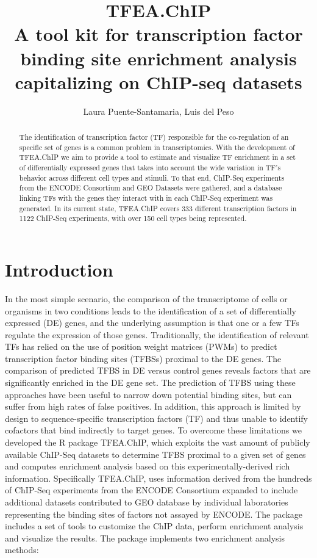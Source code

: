 \documentclass[a4paper, 12pt ]{article}
\author{Laura Puente-Santamaria, Luis del Peso}
\title{TFEA.ChIP\\\large A tool kit for transcription factor binding site enrichment analysis capitalizing on ChIP-seq datasets}
\begin{document}
	\maketitle
\begin{abstract}

The identification of transcription factor (TF) responsible for the co-regulation of an specific set of genes is a common problem in transcriptomics. With the development of TFEA.ChIP we aim to provide a tool to estimate and visualize TF enrichment in a set of differentially expressed genes that takes into account the wide variation in TF's behavior across different cell types and stimuli. To that end, ChIP-Seq experiments from the ENCODE Consortium and GEO Datasets were gathered, and a database linking TFs with the genes they interact with in each ChIP-Seq experiment was generated. In its current state, TFEA.ChIP covers 333 different transcription factors in 1122 ChIP-Seq experiments, with over 150 cell types being represented.

\end{abstract}

\section{Introduction}

 In the most simple scenario, the comparison of the transcriptome of cells or organisms in two conditions leads to the identification of a set of differentially expressed (DE) genes, and the underlying assumption is that one or a few TFs regulate the expression of those genes. Traditionally, the identification of relevant TFs has relied on the use of position weight matrices (PWMs) to predict transcription factor binding sites (TFBSs) proximal to the DE genes\cite{Wasserman}. The comparison of predicted TFBS in DE versus control genes reveals factors that are significantly enriched in the DE gene set. The prediction of TFBS using these approaches have been useful to narrow down potential binding sites, but can suffer from high rates of false positives. In addition, this approach is limited by design to sequence-specific transcription factors (TF) and thus unable to identify cofactors that bind indirectly to target genes. To overcome these limitations we developed the R package TFEA.ChIP, which exploits the vast amount of publicly available ChIP-Seq datasets to determine TFBS proximal to a given set of genes and computes enrichment analysis based on this experimentally-derived rich information. Specifically TFEA.ChIP, uses information derived from the hundreds of ChIP-Seq experiments from the ENCODE Consortium\cite{ENCODE} expanded to include additional datasets contributed to GEO database\cite{GEO1}\cite{GEO2} by individual laboratories representing the binding sites of factors not assayed by ENCODE. The package includes a set of tools to customize the ChIP data, perform enrichment analysis and visualize the results. The package implements two enrichment analysis methods:
\end{document}
